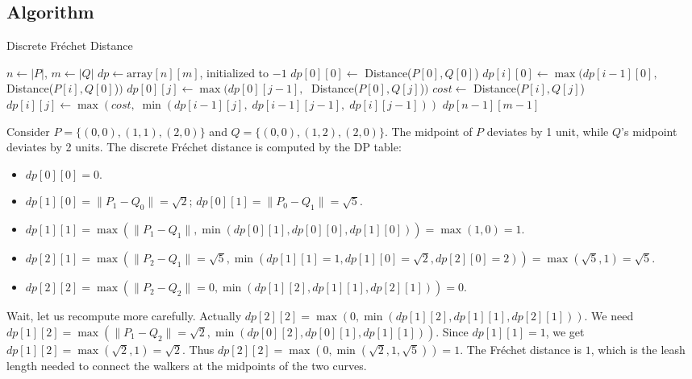 \subsection{Algorithm}
\begin{algorithm}
\caption{Discrete Fr\'{e}chet Distance\label{alg:discrete_frechet}}
\begin{algorithmic}[1]
  \State $n \gets |P|$, $m \gets |Q|$
  \State $dp \gets \text{array}[n][m]$, initialized to $-1$
  \State $dp[0][0] \gets$ Distance($P[0], Q[0]$)
    \State $dp[i][0] \gets \max(dp[i-1][0],\;$ Distance($P[i], Q[0]$)$)$
  \EndFor
    \State $dp[0][j] \gets \max(dp[0][j-1],\;$ Distance($P[0], Q[j]$)$)$
  \EndFor
      \State $cost \gets$ Distance($P[i], Q[j]$)
      \State $dp[i][j] \gets \max(cost,\; \min(dp[i-1][j],\; dp[i-1][j-1],\; dp[i][j-1]))$
    \EndFor
  \EndFor
  \State \Return $dp[n-1][m-1]$
\EndFunction
\end{algorithmic}
\end{algorithm}

\begin{example}\label{example:frechet_triangles}
Consider $P = \{(0,0), (1,1), (2,0)\}$ and $Q = \{(0,0), (1,2), (2,0)\}$. The midpoint of $P$ deviates by 1 unit, while $Q$'s midpoint deviates by 2 units. The discrete Fr\'{e}chet distance is computed by the DP table:
\begin{itemize}
  \item $dp[0][0] = 0$.
  \item $dp[1][0] = \|P_1 - Q_0\| = \sqrt{2}$; $dp[0][1] = \|P_0 - Q_1\| = \sqrt{5}$.
  \item $dp[1][1] = \max(\|P_1 - Q_1\|, \min(dp[0][1], dp[0][0], dp[1][0])) = \max(1, 0) = 1$.
  \item $dp[2][1] = \max(\|P_2 - Q_1\| = \sqrt{5}, \min(dp[1][1] = 1, dp[1][0] = \sqrt{2}, dp[2][0] = 2)) = \max(\sqrt{5}, 1) = \sqrt{5}$.
  \item $dp[2][2] = \max(\|P_2 - Q_2\| = 0, \min(dp[1][2], dp[1][1], dp[2][1])) = 0$.
\end{itemize}
Wait, let us recompute more carefully. Actually $dp[2][2] = \max(0, \min(dp[1][2], dp[1][1], dp[2][1]))$. We need $dp[1][2] = \max(\|P_1-Q_2\| = \sqrt{2}, \min(dp[0][2], dp[0][1], dp[1][1]))$. Since $dp[1][1] = 1$, we get $dp[1][2] = \max(\sqrt{2}, 1) = \sqrt{2}$. Thus $dp[2][2] = \max(0, \min(\sqrt{2}, 1, \sqrt{5})) = 1$. The Fr\'{e}chet distance is $\boxed{1}$, which is the leash length needed to connect the walkers at the midpoints of the two curves.
\end{example}

